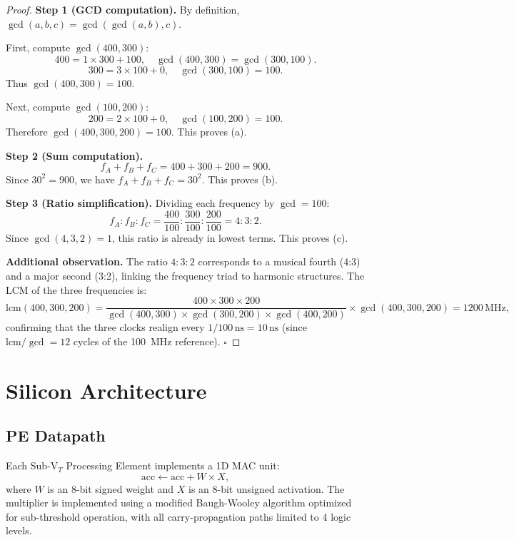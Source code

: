 \begin{proof}
\textbf{Step 1 (GCD computation).}
By definition, $\gcd(a, b, c) = \gcd(\gcd(a,b), c)$.

First, compute $\gcd(400, 300)$:
\[
  400 = 1 \times 300 + 100, \quad \gcd(400, 300) = \gcd(300, 100).
\]
\[
  300 = 3 \times 100 + 0, \quad \gcd(300, 100) = 100.
\]
Thus $\gcd(400, 300) = 100$.

Next, compute $\gcd(100, 200)$:
\[
  200 = 2 \times 100 + 0, \quad \gcd(100, 200) = 100.
\]
Therefore $\gcd(400, 300, 200) = 100$.  This proves (a).

\textbf{Step 2 (Sum computation).}
\[
  f_A + f_B + f_C = 400 + 300 + 200 = 900.
\]
Since $30^2 = 900$, we have $f_A + f_B + f_C = 30^2$.  This proves (b).

\textbf{Step 3 (Ratio simplification).}
Dividing each frequency by $\gcd = 100$:
\[
  f_A : f_B : f_C = \frac{400}{100} : \frac{300}{100} : \frac{200}{100} = 4 : 3 : 2.
\]
Since $\gcd(4, 3, 2) = 1$, this ratio is already in lowest terms.  This proves (c).

\textbf{Additional observation.} The ratio $4:3:2$ corresponds to a musical fourth
(4:3) and a major second (3:2), linking the frequency triad to harmonic structures.
The LCM of the three frequencies is:
\[
  \text{lcm}(400, 300, 200) = \frac{400 \times 300 \times 200}{\gcd(400,300) \times \gcd(300,200) \times \gcd(400,200)}
  \times \gcd(400,300,200)
  = 1200\,\text{MHz},
\]
confirming that the three clocks realign every $1/100\,\text{ns} = 10\,\text{ns}$ (since
$\text{lcm} / \gcd = 12$ cycles of the 100~MHz reference). $\square$
\end{proof}

\section{Silicon Architecture}
\label{sec:silicon_arch}

\subsection{PE Datapath}

Each Sub-V$_T$ Processing Element implements a 1D MAC unit:
\[
  \text{acc} \leftarrow \text{acc} + W \times X,
\]
where $W$ is an 8-bit signed weight and $X$ is an 8-bit unsigned activation.  The
multiplier is implemented using a modified Baugh-Wooley algorithm optimized for
sub-threshold operation, with all carry-propagation paths limited to 4 logic levels.

